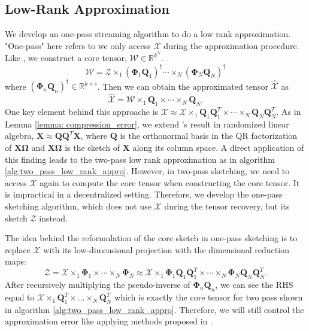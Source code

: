   
\subsection{Low-Rank Approximation} 
We develop an one-pass streaming algorithm to do a low rank approximation. "One-pass" here refers to we only access $\mathscr{X}$ during the approximation procedure. Like \cite{tropp2016randomized}, we construct a core tensor, $\mathscr{W} \in \mathbb{R}^{k^N}$. 
\begin{equation}
\mathscr{W} =
\mathscr{Z}\times_1 (\mathbf{\Phi}_1\mathbf{Q}_1)^\dag \cdots \times_N (\mathbf{\Phi}_N\mathbf{Q}_N)^\dag 
\end{equation}
where $(\mathbf{\Phi}_n \mathbf{Q}_n)^\dag \in \mathbb{R}^{k \times s} $. Then we can obtain the approximated tensor $\hat{\mathscr{X}}$ as
\begin{equation}
\hat{\mathscr{X}} = \mathscr{W} \times_1 \mathbf{Q}_1 \times \cdots \times_N \mathbf{Q}_N.
\end{equation}
One key element behind this approache is $\mathscr{X} \approx \mathscr{X} \times_1 \mathbf{Q}_1\mathbf{Q}_1^T \times \cdots \times_N \mathbf{Q}_N\mathbf{Q}_N^T$. As in Lemma \ref{lemma: compression_error}, we extend \cite{halko2011finding}'s result in randomized linear algebra, $\mathbf{X} \approx \mathbf{Q}\mathbf{Q}^T\mathbf{X}$, where $\mathbf{Q}$ is the orthonormal basis in the QR factorization of $\mathbf{X}\mathbf{\Omega}$ and $\mathbf{X}\mathbf{\Omega}$ is the sketch of $\mathbf{X}$ along its column space. A direct application of this finding leads to the two-pass low rank approximation as in algorithm \ref{alg:two_pass_low_rank_appro}. However, in two-pass sketching, we need to access $\mathscr{X}$ again to compute the core tensor when constructing the core tensor. It is impractical in a decentralized setting. Therefore, we develop the one-pass sketching algorithm, which does not use $\mathscr{X}$ during the tensor recovery, but its sketch $\mathscr{Z}$ instead. \par 
The idea behind the reformulation of the core sketch in one-pass sketching is to replace $\mathscr{X}$ with its low-dimensional projection with the dimensional reduction maps:
\begin{equation}
\mathscr{Z} = \mathscr{X}\times_1 \mathbf{\Phi}_1 \times \cdots \times_N \mathbf{\Phi}_N \approx \mathscr{X}\times_1 \mathbf{\Phi}_1\mathbf{Q}_1\mathbf{Q}_1^T \times \cdots \times_N \mathbf{\Phi}_N\mathbf{Q}_N\mathbf{Q}_N^T.
\end{equation}
After recursively multiplying the pseudo-inverse of $\mathbf{\Phi}_n\mathbf{Q}_n$, we can see the RHS equal to $\mathscr{X} \times_1 \mathbf{Q}_1^T  \times \dots \times_N \mathbf{Q}^T_N$ which is exactly the core tensor for two pass shown in algorithm \ref{alg:two_pass_low_rank_appro}. Therefore, we will still control the approximation error like applying methods proposed in \citep{clarkson2009numerical,tropp2017practical}. 

